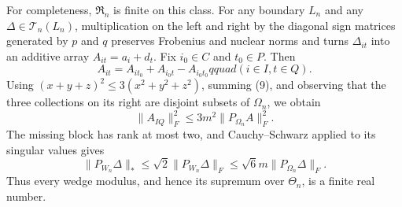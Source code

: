 For completeness, \(\mathfrak R_n\) is finite on this class.  For any boundary \(L_n\) and any \(\Delta\in\mathcal T_n(L_n)\), multiplication on the left and right by the diagonal sign matrices generated by \(p\) and \(q\) preserves Frobenius and nuclear norms and turns \(\Delta_{it}\) into an additive array \(A_{it}=a_i+d_t\).  Fix \(i_0\in C\) and \(t_0\in P\).  Then
\[
A_{it}=A_{i t_0}+A_{i_0t}-A_{i_0t_0}qquad(i\in I, t\in Q).       \tag{9}
\]
Using \((x+y+z)^2\le3(x^2+y^2+z^2)\), summing (9), and observing that the three collections on its right are disjoint subsets of \(\Omega_n\), we obtain
\[
\lVert A_{I Q}\rVert_F^2
\le3m^2\lVert P_{\Omega_n}A\rVert_F^2.                \tag{10}
\]
The missing block has rank at most two, and Cauchy--Schwarz applied to its singular values gives
\[
\lVert P_{W_n}\Delta\rVert_*
\le\sqrt2\lVert P_{W_n}\Delta\rVert_F
\le\sqrt6m\lVert P_{\Omega_n}\Delta\rVert_F.         \tag{11}
\]
Thus every wedge modulus, and hence its supremum over \(\Theta_n\), is a finite real number.

